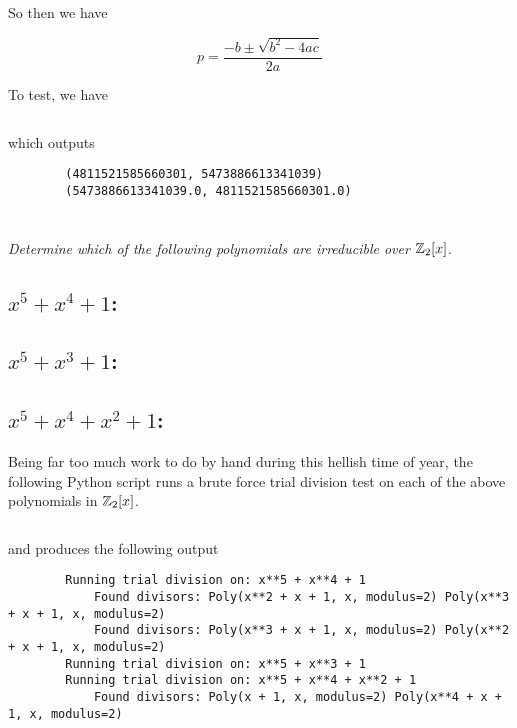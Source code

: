\documentclass[12pt]{article}
\begin{document}
    So then we have

    $$p = \frac{-b \pm \sqrt{b^2 - 4ac}}{2a}$$

    To test, we have

    \inputminted{python}{scripts/prob_1.py}

    which outputs

    \begin{verbatim}
        (4811521585660301, 5473886613341039)
        (5473886613341039.0, 4811521585660301.0)
    \end{verbatim}

\section{} \textit{Determine which of the following polynomials are irreducible over $\mathbb{Z}_2 [x]$.}

    \subsection{$x^5 + x^4 + 1$:}
    \subsection{$x^5 + x^3 + 1$:}
    \subsection{$x^5 + x^4 + x^2 + 1$:}

        Being far too much work to do by hand during this hellish time of year, the following Python script runs a brute force trial division test on each of the above polynomials in $\mathbb{Z}_2[x]$.

        \inputminted{python}{scripts/prob_2abc.py}

        and produces the following output

        \begin{verbatim}
        Running trial division on: x**5 + x**4 + 1
            Found divisors: Poly(x**2 + x + 1, x, modulus=2) Poly(x**3 + x + 1, x, modulus=2)
            Found divisors: Poly(x**3 + x + 1, x, modulus=2) Poly(x**2 + x + 1, x, modulus=2)
        Running trial division on: x**5 + x**3 + 1
        Running trial division on: x**5 + x**4 + x**2 + 1
            Found divisors: Poly(x + 1, x, modulus=2) Poly(x**4 + x + 1, x, modulus=2)
        \end{verbatim}
\end{document}
